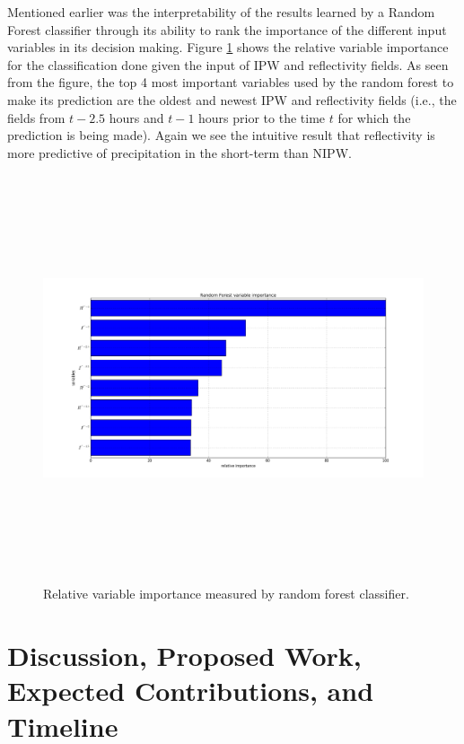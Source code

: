 \documentclass[proposal]{umassthesis}
\begin{document}
{Mentioned earlier was the interpretability of the results learned by a Random Forest classifier through its ability to rank the importance of the different input variables in its decision making. Figure \ref{fig:variable_importance} shows the relative variable importance for the classification done given the input of IPW and reflectivity fields. As seen from the figure, the top 4 most important variables used by the random forest to make its prediction are the oldest and newest IPW and reflectivity fields (i.e., the fields from $t - 2.5$ hours and $t -1$ hours prior to the time $t$ for which the prediction is being made). Again we see the intuitive result that reflectivity is more predictive of precipitation in the short-term than NIPW.

\begin{figure}[!t]
\begin{center}
\includegraphics[width = 15cm,height = 12cm]{random_forest_feature_importance}
\caption{Relative variable importance measured by random forest classifier.}\label{fig:variable_importance}
\end{center}
\end{figure}

\chapter{Discussion, Proposed Work, Expected Contributions, and Timeline}

}
\end{document}
